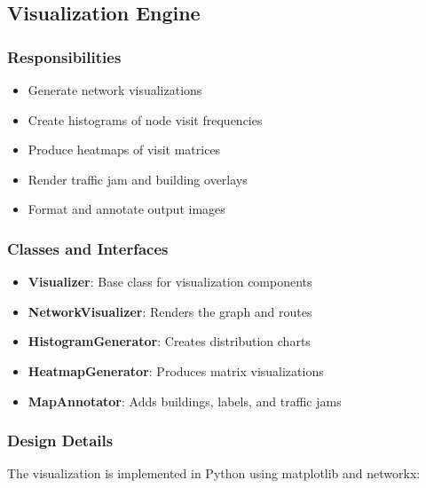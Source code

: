 \documentclass[conference]{IEEEtran}
\begin{document}
\subsection{Visualization Engine}

\subsubsection{Responsibilities}
\begin{itemize}
    \item Generate network visualizations
    \item Create histograms of node visit frequencies
    \item Produce heatmaps of visit matrices
    \item Render traffic jam and building overlays
    \item Format and annotate output images
\end{itemize}

\subsubsection{Classes and Interfaces}
\begin{itemize}
    \item \textbf{Visualizer}: Base class for visualization components
    \item \textbf{NetworkVisualizer}: Renders the graph and routes
    \item \textbf{HistogramGenerator}: Creates distribution charts
    \item \textbf{HeatmapGenerator}: Produces matrix visualizations
    \item \textbf{MapAnnotator}: Adds buildings, labels, and traffic jams
\end{itemize}

\subsubsection{Design Details}
The visualization is implemented in Python using matplotlib and networkx:
\end{document}
